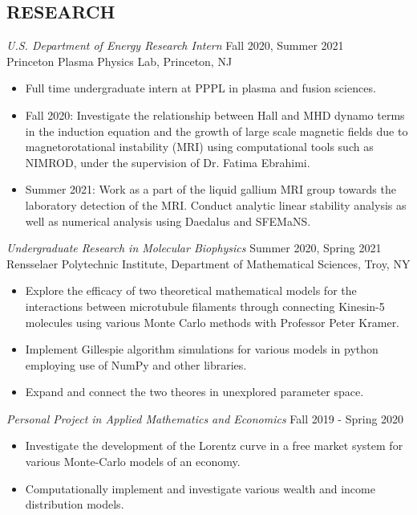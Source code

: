 \documentclass[margin]{rpires}
\begin{document}
\begin{resume}
\section{RESEARCH}      
    {\sl U.S. Department of Energy Research Intern} \hfill Fall 2020, Summer 2021 \\
    Princeton Plasma Physics Lab, 
    Princeton, NJ 
    \begin{itemize}  \itemsep -2pt %
    \item Full time undergraduate intern at PPPL in plasma and fusion sciences.
    \item Fall 2020: Investigate the relationship between Hall and MHD dynamo terms in the induction equation and the growth of large scale magnetic fields due to magnetorotational instability (MRI) using computational tools such as NIMROD, under the supervision of Dr. Fatima Ebrahimi. 
    \item Summer 2021: Work as a part of the liquid gallium MRI group towards the laboratory detection of the MRI. Conduct analytic linear stability analysis as well as numerical analysis using Daedalus and SFEMaNS. 
    \end{itemize}

    {\sl Undergraduate Research in Molecular Biophysics} \hfill Summer 2020, Spring 2021 \\
    Rensselaer Polytechnic Institute, 
    Department of Mathematical Sciences, Troy, NY 
    \begin{itemize}  \itemsep -2pt %
    \item Explore the efficacy of two theoretical mathematical models for the interactions between microtubule filaments through connecting
    Kinesin-5 molecules using various Monte Carlo methods with Professor Peter Kramer.
    \item Implement Gillespie algorithm simulations for various models in python employing use of NumPy and other libraries. 
    \item   Expand and connect the two theores in unexplored parameter space.
    \end{itemize}

    {\sl Personal Project in Applied Mathematics and Economics} \hfill Fall 2019 - Spring 2020
    \begin{itemize}  \itemsep -2pt %
        \item Investigate the development of the Lorentz curve in a free market system for various Monte-Carlo models of an economy.
        \item Computationally implement and investigate various wealth and income distribution models.
    \end{itemize}


\end{resume}
\end{document}
